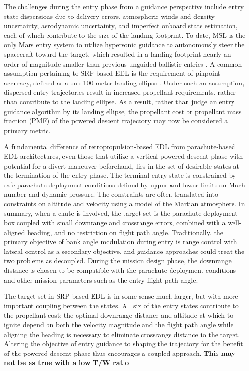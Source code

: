 \documentclass[letterpaper, preprint, paper,11pt]{AAS}
\begin{document}
The challenges during the entry phase from a guidance perspective include entry state dispersions due to delivery errors, atmospheric winds and density uncertainty, aerodynamic uncertainty, and imperfect onboard state estimation, each of which contribute to the size of the landing footprint. To date, MSL is the only Mars entry system to utilize hypersonic guidance to autonomously steer the spacecraft toward the target, which resulted in a landing footprint nearly an order of magnitude smaller than previous unguided ballistic entries \cite{BraunMarsEDL}. A common assumption pertaining to SRP-based EDL is the requirement of pinpoint accuracy, defined as a sub-100 meter landing ellipse \cite{GNC_Pinpoint}. Under such an assumption, dispersed entry trajectories result in increased propellant requirements, rather than contribute to the landing ellipse. As a result, rather than judge an entry guidance algorithm by its landing ellipse, the propellant cost or propellant mass fraction (PMF) of the powered descent trajectory may now be considered a primary metric.

A fundamental difference of retropropulsion-based EDL from parachute-based EDL architectures, even those that utilize a vertical powered descent phase with potential for a divert maneuver beforehand, lies in the set of desirable states at the termination of the entry phase. The terminal entry state is constrained by safe parachute deployment conditions defined by upper and lower limits on Mach number and dynamic pressure. The constraints are often translated into constraints on altitude and velocity using a model of the Martian atmosphere. In summary, when a chute is involved, the target set is the parachute deployment box coupled with small downrange and crossrange errors, combined with a well-aligned heading, and no restriction on flight path angle. Traditionally, the primary objective of bank angle modulation during entry is range control with lateral control as a secondary objective, and guidance approaches could treat the two problems as decoupled. During the mission design phase, the downrange distance is chosen to be compatible with the parachute deployment conditions and other mission parameters such as the entry flight path angle.

The target set in SRP-based EDL is in some sense much larger, but with more important coupling between the states. All six of the entry states contribute to the propellant cost; the optimal downrange distance and altitude at which to ignite depend on both the velocity magnitude and the flight path angle while aligning the heading is necessary to eliminate crossrange distance to the target. Altering the objective of entry guidance to shaping the trajectory for the benefit of the powered descent phase thus encourages a coupled approach. \textbf{This may not be as true with a low T/W ratio} 
\end{document}
